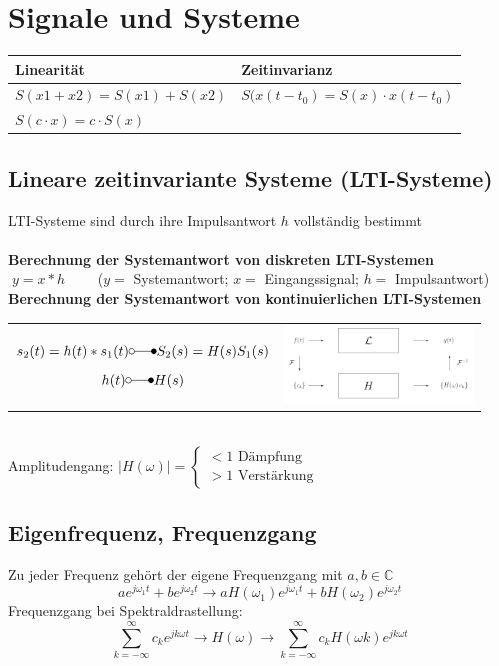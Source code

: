 \section{Signale und Systeme}
	\begin{tabular}{|l|l|}
    	\hline
    	\textbf{Linearität} & \textbf{Zeitinvarianz}\\
    	\hline
    	$S(x1+x2)=S(x1)+S(x2)$ & $S(x(t-t_0)=S(x)\cdot x(t-t_0)$ \\
    	$S(c\cdot x)=c\cdot S(x)$ & \\
		\hline    
    \end{tabular}
	
	\subsection{Lineare zeitinvariante Systeme (LTI-Systeme)}
		LTI-Systeme sind durch ihre Impulsantwort $h$ vollständig bestimmt\\ \\
		\textbf{Berechnung der Systemantwort von diskreten LTI-Systemen}\\
		$\; y=x*h \qquad$ ($y=$ Systemantwort; $x=$ Eingangssignal; $h=$
		Impulsantwort)\\
		
		\textbf{Berechnung der Systemantwort von kontinuierlichen LTI-Systemen}\\
		\begin{tabular}{ll}
			\parbox{8cm}{
			$$s_2(t) = h(t) * s_1(t) \laplace S_2(s) = H(s) S_1(s)$$
			$$h(t) \laplace H(s)$$}
			& \parbox{4cm}{
			\includegraphics[width=5cm]{./bilder/utf-theorie.png}}\\
		\end{tabular} \\
		Amplitudengang: 		$|H(\omega)| = \begin{cases}
								< 1 \text{ Dämpfung} \\
								> 1 \text{ Verstärkung}
								\end{cases}$	\\

	\subsection{Eigenfrequenz, Frequenzgang}
	Zu jeder Frequenz gehört der eigene Frequenzgang mit $a, b \in \mathbb{C}$\\
	$$a e^{j\omega_1 t} + b e^{j\omega_2 t} \rightarrow a H(\omega_1) e^{j\omega_1 t} + b H(\omega_2) e^{j\omega_2 t}$$
	Frequenzgang bei Spektraldrastellung: $$\sum_{k=-\infty}^{\infty} c_k e^{jk\omega t} \rightarrow \boxed{H(\omega)}
	\rightarrow \sum_{k=-\infty}^{\infty} c_k H(\omega k) e^{jk\omega t}$$			
		
